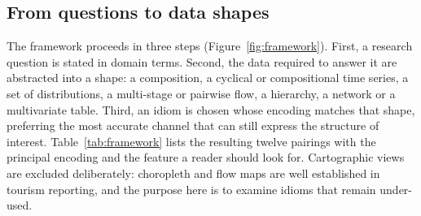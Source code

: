 \documentclass{article}
\begin{document}
\subsection{From questions to data shapes}
The framework proceeds in three steps (Figure~\ref{fig:framework}). First, a research question is stated in
domain terms. Second, the data required to answer it are abstracted into a shape: a composition, a cyclical
or compositional time series, a set of distributions, a multi-stage or pairwise flow, a hierarchy, a network
or a multivariate table. Third, an idiom is chosen whose encoding matches that shape, preferring the most
accurate channel that can still express the structure of interest. Table~\ref{tab:framework} lists the
resulting twelve pairings with the principal encoding and the feature a reader should look for. Cartographic
views are excluded deliberately: choropleth and flow maps are well established in tourism reporting, and the
purpose here is to examine idioms that remain under-used.
\end{document}
